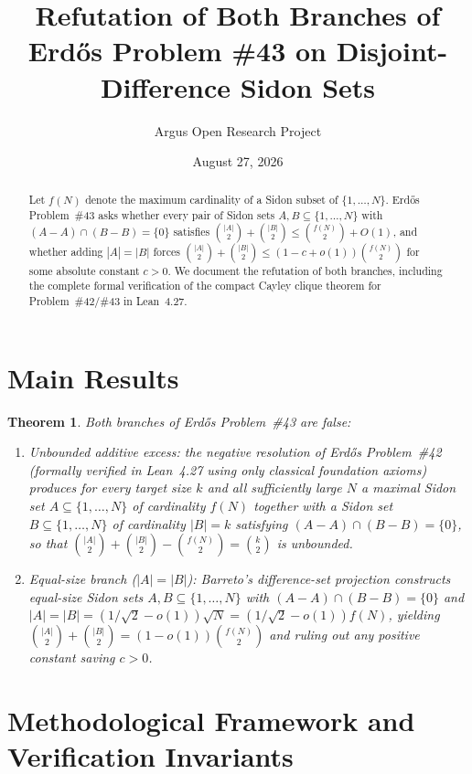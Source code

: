 \documentclass[10pt,reqno]{amsart}
\title[Disjoint-Difference Sidon Sets and Erd\H{o}s Problem \#43]
{Refutation of Both Branches of Erd\H{o}s Problem \#43 on Disjoint-Difference Sidon Sets}
\author{Argus Open Research Project}
\date{August 27, 2026}
\newtheorem{theorem}{Theorem}[section]
\theoremstyle{definition}
\begin{document}
\begin{abstract}
Let $f(N)$ denote the maximum cardinality of a Sidon subset of $\{1,\dots,N\}$. Erd\H{o}s Problem~\#43 asks whether every pair of Sidon sets $A,B\subseteq\{1,\dots,N\}$ with $(A-A)\cap(B-B)=\{0\}$ satisfies $\binom{|A|}{2}+\binom{|B|}{2}\le\binom{f(N)}{2}+O(1)$, and whether adding $|A|=|B|$ forces $\binom{|A|}{2}+\binom{|B|}{2}\le(1-c+o(1))\binom{f(N)}{2}$ for some absolute constant $c>0$. We document the refutation of both branches, including the complete formal verification of the compact Cayley clique theorem for Problem~\#42/\#43 in Lean~4.27.
\end{abstract}
\maketitle
\section{Main Results}
\begin{theorem}
Both branches of Erd\H{o}s Problem~\#43 are false:
\begin{enumerate}[label=\textup{(\arabic*)}]
  \item \emph{Unbounded additive excess:} the negative resolution of Erd\H{o}s Problem~\#42 (formally verified in Lean~4.27 using only classical foundation axioms) produces for every target size $k$ and all sufficiently large $N$ a maximal Sidon set $A\subseteq\{1,\dots,N\}$ of cardinality $f(N)$ together with a Sidon set $B\subseteq\{1,\dots,N\}$ of cardinality $|B|=k$ satisfying $(A-A)\cap(B-B)=\{0\}$, so that $\binom{|A|}{2}+\binom{|B|}{2}-\binom{f(N)}{2}=\binom{k}{2}$ is unbounded.
  \item \emph{Equal-size branch ($|A|=|B|$):} Barreto's difference-set projection constructs equal-size Sidon sets $A,B\subseteq\{1,\dots,N\}$ with $(A-A)\cap(B-B)=\{0\}$ and $|A|=|B|=(1/\sqrt{2}-o(1))\sqrt{N} = (1/\sqrt{2}-o(1))f(N)$, yielding $\binom{|A|}{2}+\binom{|B|}{2} = (1-o(1))\binom{f(N)}{2}$ and ruling out any positive constant saving $c>0$.
\end{enumerate}
\end{theorem}

\section{Methodological Framework and Verification Invariants}
\end{document}
